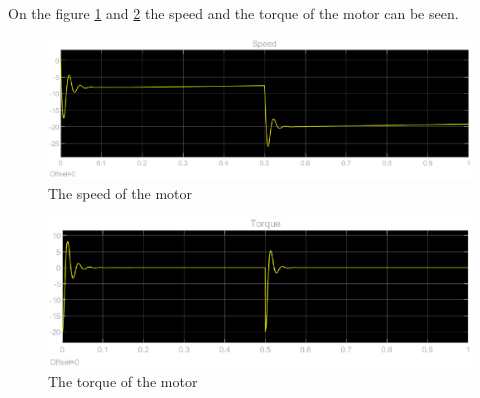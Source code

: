 On the figure \ref{fig:speed} and \ref{fig:torque} the speed and the torque of the motor can be seen.

\begin{figure}[H]
	\centering
	\includegraphics[width=0.7\linewidth]{pictures/control/speed.eps}
	\caption{The speed of the motor}
	\label{fig:speed}
\end{figure}

\begin{figure}[H]
	\centering
	\includegraphics[width=0.7\linewidth]{pictures/control/torque.eps}
	\caption{The torque of the motor}
	\label{fig:torque}
\end{figure}

